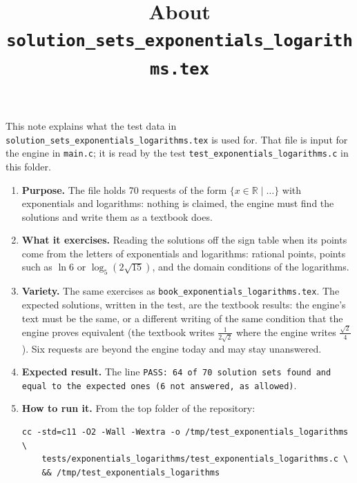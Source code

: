 \documentclass[11pt,a4paper]{article}
\title{About \texttt{solution\_sets\_exponentials\_logarithms.tex}}
\author{}
\date{}
\begin{document}
\maketitle
This note explains what the test data in \texttt{solution\_sets\_exponentials\_logarithms.tex} is used for. That file is input for the engine in \texttt{main.c}; it is read by the test \texttt{test\_exponentials\_logarithms.c} in this folder.

\begin{enumerate}
\item \textbf{Purpose.} The file holds 70 requests of the form $\{x \in \mathbb{R} \mid \ldots\}$ with exponentials and logarithms: nothing is claimed, the engine must find the solutions and write them as a textbook does.

\item \textbf{What it exercises.} Reading the solutions off the sign table when its points come from the letters of exponentials and logarithms: rational points, points such as $\ln 6$ or $\log_{5}(2\sqrt{15})$, and the domain conditions of the logarithms.

\item \textbf{Variety.} The same exercises as \texttt{book\_exponentials\_logarithms.tex}. The expected solutions, written in the test, are the textbook results: the engine's text must be the same, or a different writing of the same condition that the engine proves equivalent (the textbook writes $\frac{1}{2\sqrt{2}}$ where the engine writes $\frac{\sqrt{2}}{4}$). Six requests are beyond the engine today and may stay unanswered.

\item \textbf{Expected result.} The line \texttt{PASS: 64 of 70 solution sets found and equal to the expected ones (6 not answered, as allowed)}.

\item \textbf{How to run it.} From the top folder of the repository:
\begin{verbatim}
cc -std=c11 -O2 -Wall -Wextra -o /tmp/test_exponentials_logarithms \
    tests/exponentials_logarithms/test_exponentials_logarithms.c \
    && /tmp/test_exponentials_logarithms
\end{verbatim}
\end{enumerate}
\end{document}
